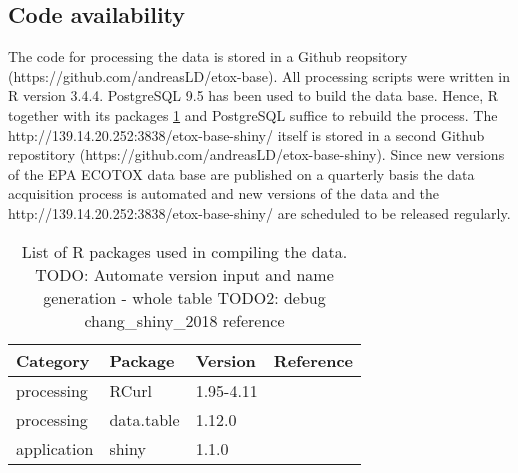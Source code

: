 \documentclass[english]{article}
\newcommand{\epa}{EPA ECOTOX data base}
\newcommand{\app}{http://139.14.20.252:3838/etox-base-shiny/}
\newcommand{\git}{https://github.com/andreasLD/etox-base}
\newcommand{\gitapp}{https://github.com/andreasLD/etox-base-shiny}
\begin{document}
\subsection*{Code availability}

The code for processing the data is stored in a Github reopsitory (\git{}). All processing scripts were written in R version 3.4.4. PostgreSQL 9.5 has been used to build the data base. Hence, R together with its packages \ref{tab:rpackages} and PostgreSQL suffice to rebuild the process. The \app{} itself is stored in a second Github repostitory (\gitapp{}).
Since new versions of the \epa{} are published on a quarterly basis the data acquisition process is automated and new versions of the data and the \app{} are scheduled to be released regularly.

\begin{table}[]
    \centering
    \begin{tabular}{|l|l|l|l|}
        \hline
        Category        & Package       & Version   & Reference                     \\ \hline
        processing      & RCurl         & 1.95-4.11 & \citep{lang_rcurl_2018}       \\ \hline
        processing      & data.table    & 1.12.0    & \citep{dowle_data.table_2018} \\ \hline
        application     & shiny         & 1.1.0     & \citep{chang_shiny_2018}      \\ \hline
    \end{tabular}
    \caption{List of R packages used in compiling the data.\newline{}
    TODO: Automate version input and name generation - whole table\newline{}
    TODO2: debug chang\_shiny\_2018 reference}
    \label{tab:rpackages}
\end{table}
\end{document}
